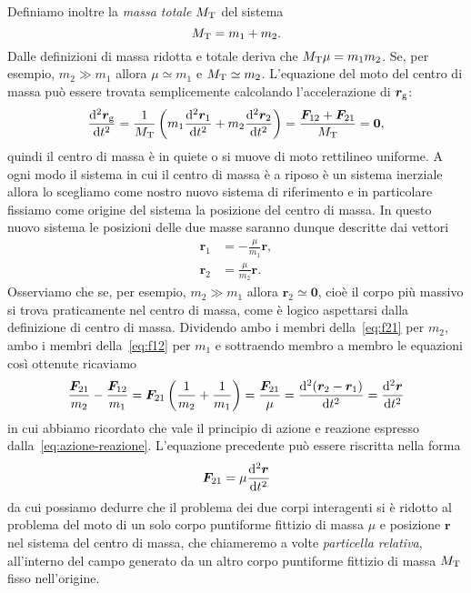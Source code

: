 Definiamo inoltre la \emph{massa totale} $M_\textup{T}$ del sistema
\begin{equation}
  M_\textup{T}=m_1+m_2.
\end{equation}
Dalle definizioni di massa ridotta e totale deriva che
$M_\textup{T}\mu=m_1m_2$. Se, per esempio, $m_2\gg m_1$ allora $\mu\simeq m_1$ e
$M_\textup{T}\simeq m_2$. L'equazione del moto del centro di massa può essere
trovata semplicemente calcolando l'accelerazione di $\bm{r}_\textup{g}$:
\begin{equation}
  \toder[2]{\bm{r}_\textup{g}}{t} = \frac{1}{M_\textup{T}}
  \left(
    m_1\toder[2]{\bm{r}_1}{t} + m_2\toder[2]{\bm{r}_2}{t}
  \right) = \frac{\bm{F}_{12}+\bm{F}_{21}}{M_\textup{T}} = \bm{0},
\end{equation}
quindi il centro di massa è in quiete o si muove di moto rettilineo uniforme. A
ogni modo il sistema in cui il centro di massa è a riposo è un sistema inerziale
allora lo scegliamo come nostro nuovo sistema di riferimento e in particolare
fissiamo come origine del sistema la posizione del centro di massa. In questo
nuovo sistema le posizioni delle due masse saranno dunque descritte dai vettori
\begin{subequations}
  \label{eq:r1-r2-nel-cdm}
  \begin{align}
    \bm{r}_1 &= -\frac{\mu}{m_1}\bm{r},\\
    \bm{r}_2 &= \frac{\mu}{m_2}\bm{r}.
  \end{align}
\end{subequations}
Osserviamo che se, per esempio, $m_2\gg m_1$ allora $\bm{r}_2\simeq\bm{0}$, cioè
il corpo più massivo si trova praticamente nel centro di massa, come è logico
aspettarsi dalla definizione di centro di massa. Dividendo ambo i membri
della~\eqref{eq:f21} per $m_2$, ambo i membri della~\eqref{eq:f12} per $m_1$ e
sottraendo membro a membro le equazioni così ottenute ricaviamo
\begin{equation}
  \frac{\bm{F}_{21}}{m_2}-\frac{\bm{F}_{12}}{m_1} = \bm{F}_{21}
  \left(
    \frac{1}{m_2}+\frac{1}{m_1}
  \right) = \frac{\bm{F}_{21}}{\mu} = \toder[2]{(\bm{r}_2-\bm{r}_1)}{t} =
  \toder[2]{\bm{r}}{t}
\end{equation}
in cui abbiamo ricordato che vale il principio di azione e reazione espresso
dalla~\eqref{eq:azione-reazione}. L'equazione precedente può essere riscritta
nella forma
\begin{equation}
  \label{eq:f21-mu}
  \bm{F}_{21}=\mu\toder[2]{\bm{r}}{t}
\end{equation}
da cui possiamo dedurre che il problema dei due corpi interagenti si è ridotto
al problema del moto di un solo corpo puntiforme fittizio di massa $\mu$ e
posizione $\bm{r}$ nel sistema del centro di massa, che chiameremo a volte
\emph{particella relativa}, all'interno del campo generato da un altro corpo
puntiforme fittizio di massa $M_\textup{T}$ fisso nell'origine.

